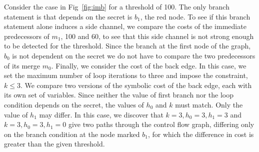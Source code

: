 Consider the case in Fig~\ref{fig:imb} for a threshold of 100. The only branch statement is  that depends on the secret is $b_1$, the red node. To see if this branch statement alone induces a side channel, we compare the costs of the immediate predecessors of $m_1$, 100 and 60, to see that this side channel is not strong enough to be detected for the threshold. Since the branch at the first node of the graph, $b_0$ is not dependent on the secret we do not have to compare the two predecessors of its merge $m_0$. Finally, we consider the cost of the back edge. In this case, we set the maximum number of loop iterations to three and impose the constraint, $k \leq 3$. We compare two versions of the symbolic cost of the back edge, each with its own set of variables. Since neither the value of first branch nor the loop condition depends on the secret, the values of $h_0$ and $k$ must match. Only the value of $h_1$ may differ. In this case, we discover that $k = 3, h_0 = 3,h_1 = 3$ and $k = 3, h_0 = 3, h_1 = 0$ give two paths through the control flow graph, differing only on the branch condition at the node marked $b_1$, for which the difference in cost is greater than the given threshold. 